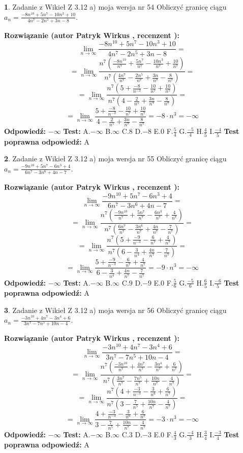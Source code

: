 \documentclass[12pt, a4paper]{article}
\theoremstyle{definition} %
\newtheorem{zad}{}
\newcommand{\zadStart}[1]{\begin{zad}#1\newline}
\newcommand{\zadStop}{\end{zad}}
\newcommand{\rozwStart}[2]{\noindent \textbf{Rozwiązanie (autor #1 , recenzent #2): }\newline}
\newcommand{\rozwStop}{\newline}
\newcommand{\odpStart}{\noindent \textbf{Odpowiedź:}\newline}
\newcommand{\odpStop}{\newline}
\newcommand{\testStart}{\noindent \textbf{Test:}\newline}
\newcommand{\testStop}{\newline}
\newcommand{\kluczStart}{\noindent \textbf{Test poprawna odpowiedź:}\newline}
\newcommand{\kluczStop}{\newline}
\begin{document}
\zadStart{Zadanie z Wikieł Z 3.12 a) moja wersja nr 54}
Obliczyć granicę ciągu $a_{n}=\frac{-8n^{10}+5n^{7}-10n^{3}+10}{4n^{7}-2n^{5}+3n-8}$.
\zadStop
\rozwStart{Patryk Wirkus}{}
$$\lim\limits_{n\to\infty}\frac{-8n^{10}+5n^{7}-10n^{3}+10}{4n^{7}-2n^{5}+3n-8}=$$
$$=\lim\limits_{n\to\infty}\frac{n^{7}\left(\frac{-8n^{10}}{n^{7}}+\frac{5n^{7}}{n^{7}}-\frac{10n^{3}}{n^{7}}+\frac{10}{n^{7}}\right)}{n^{7}\left(\frac{4n^{7}}{n^{7}}-\frac{2n^{5}}{n^{7}}+\frac{3n}{n^{7}}-\frac{8}{n^{7}}\right)}=$$
$$=\lim\limits_{n\to\infty}\frac{n^{7}\left(5+\frac{-8}{n^{-3}}-\frac{10}{n^{7}}+\frac{10}{n^{7}}\right)}
{n^{7}\left(4-\frac{2}{n^{5}}+\frac{3n}{n^{7}}-\frac{8}{n^{7}}\right)}=$$
$$=\lim\limits_{n\to\infty}\frac{5+\frac{-8}{n^{-3}}-\frac{10}{n^{7}}+\frac{10}{n^{7}}}{4-\frac{2}{n^{5}}+\frac{3n}{n^{7}}-\frac{8}{n^{7}}}=-8\cdot n^{3} = -\infty$$
\rozwStop
\odpStart
$-\infty$
\odpStop
\testStart
A.$-\infty$
B.$\infty$
C.$8$
D.$-8$
E.$0$
F.$\frac{5}{4}$
G.$\frac{-5}{4}$
H.$\frac{4}{5}$
I.$\frac{-4}{5}$
\testStop
\kluczStart
A
\kluczStop



\zadStart{Zadanie z Wikieł Z 3.12 a) moja wersja nr 55}
Obliczyć granicę ciągu $a_{n}=\frac{-9n^{10}+5n^{7}-6n^{3}+4}{6n^{7}-3n^{6}+4n-7}$.
\zadStop
\rozwStart{Patryk Wirkus}{}
$$\lim\limits_{n\to\infty}\frac{-9n^{10}+5n^{7}-6n^{3}+4}{6n^{7}-3n^{6}+4n-7}=$$
$$=\lim\limits_{n\to\infty}\frac{n^{7}\left(\frac{-9n^{10}}{n^{7}}+\frac{5n^{7}}{n^{7}}-\frac{6n^{3}}{n^{7}}+\frac{4}{n^{7}}\right)}{n^{7}\left(\frac{6n^{7}}{n^{7}}-\frac{3n^{6}}{n^{7}}+\frac{4n}{n^{7}}-\frac{7}{n^{7}}\right)}=$$
$$=\lim\limits_{n\to\infty}\frac{n^{7}\left(5+\frac{-9}{n^{-3}}-\frac{6}{n^{7}}+\frac{4}{n^{7}}\right)}
{n^{7}\left(6-\frac{3}{n^{4}}+\frac{4n}{n^{7}}-\frac{7}{n^{7}}\right)}=$$
$$=\lim\limits_{n\to\infty}\frac{5+\frac{-9}{n^{-3}}-\frac{6}{n^{7}}+\frac{4}{n^{7}}}{6-\frac{3}{n^{4}}+\frac{4n}{n^{7}}-\frac{7}{n^{7}}}=-9\cdot n^{3} = -\infty$$
\rozwStop
\odpStart
$-\infty$
\odpStop
\testStart
A.$-\infty$
B.$\infty$
C.$9$
D.$-9$
E.$0$
F.$\frac{5}{6}$
G.$\frac{-5}{6}$
H.$\frac{6}{5}$
I.$\frac{-6}{5}$
\testStop
\kluczStart
A
\kluczStop



\zadStart{Zadanie z Wikieł Z 3.12 a) moja wersja nr 56}
Obliczyć granicę ciągu $a_{n}=\frac{-3n^{10}+4n^{7}-3n^{4}+6}{3n^{7}-7n^{5}+10n-4}$.
\zadStop
\rozwStart{Patryk Wirkus}{}
$$\lim\limits_{n\to\infty}\frac{-3n^{10}+4n^{7}-3n^{4}+6}{3n^{7}-7n^{5}+10n-4}=$$
$$=\lim\limits_{n\to\infty}\frac{n^{7}\left(\frac{-3n^{10}}{n^{7}}+\frac{4n^{7}}{n^{7}}-\frac{3n^{4}}{n^{7}}+\frac{6}{n^{7}}\right)}{n^{7}\left(\frac{3n^{7}}{n^{7}}-\frac{7n^{5}}{n^{7}}+\frac{10n}{n^{7}}-\frac{4}{n^{7}}\right)}=$$
$$=\lim\limits_{n\to\infty}\frac{n^{7}\left(4+\frac{-3}{n^{-3}}-\frac{3}{n^{6}}+\frac{6}{n^{7}}\right)}
{n^{7}\left(3-\frac{7}{n^{5}}+\frac{10n}{n^{7}}-\frac{4}{n^{7}}\right)}=$$
$$=\lim\limits_{n\to\infty}\frac{4+\frac{-3}{n^{-3}}-\frac{3}{n^{6}}+\frac{6}{n^{7}}}{3-\frac{7}{n^{5}}+\frac{10n}{n^{7}}-\frac{4}{n^{7}}}=-3\cdot n^{3} = -\infty$$
\rozwStop
\odpStart
$-\infty$
\odpStop
\testStart
A.$-\infty$
B.$\infty$
C.$3$
D.$-3$
E.$0$
F.$\frac{4}{3}$
G.$\frac{-4}{3}$
H.$\frac{3}{4}$
I.$\frac{-3}{4}$
\testStop
\kluczStart
A
\kluczStop
\end{document}
